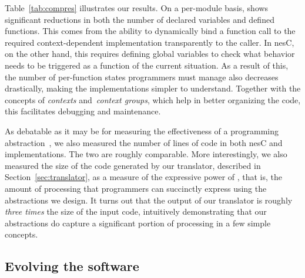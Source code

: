  Table~\ref{tab:compres} illustrates our
results. On a per-module basis, \conesc shows significant reductions
in both the number of declared variables and defined functions. This
comes from the ability to dynamically bind a function call to the
required context-dependent implementation transparently to the
caller. In nesC, on the other hand, this requires defining global
variables to check what behavior needs to be triggered as a function
of the current situation. As a result of this, the number of
per-function states programmers must manage also decreases
drastically, making the implementations simpler to
understand. Together with the concepts of \emph{contexts}
and~\emph{context groups}, which help in better organizing the code,
this facilitates debugging and maintenance.



As debatable as it may be for measuring the effectiveness of a
programming abstraction~\cite{mottolasurvey}, we also measured the
number of lines of code in both nesC and \conesc implementations. The
two are roughly comparable. More interestingly, we also measured the
size of the code generated by our translator, described in
Section~\ref{sec:translator}, as a measure of the expressive power of
\conesc, that is, the amount of processing that \conesc programmers
can succinctly express using the abstractions we design. It turns out
that the output of our translator is roughly \emph{three times} the
size of the input code, intuitively demonstrating that our
abstractions do capture a significant portion of processing in a few
simple concepts.

\subsection{Evolving the software}\label{sec:evolve}

